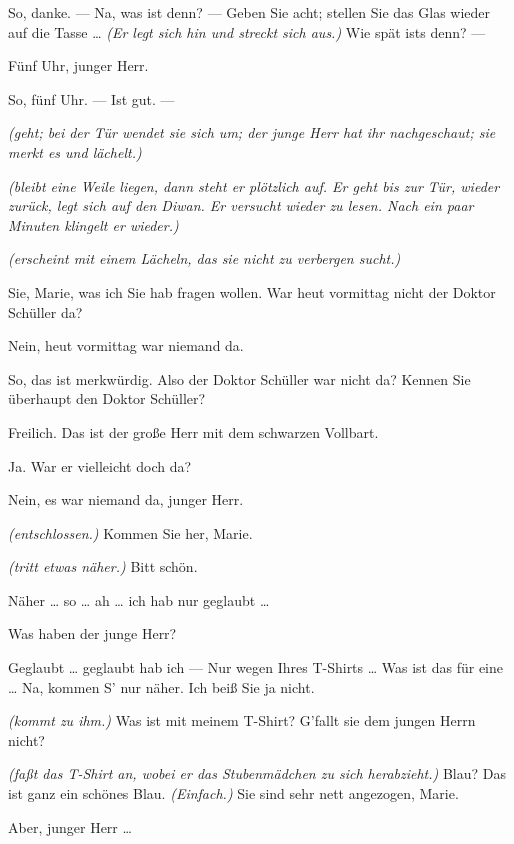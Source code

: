 \documentclass[
	final,
	a4paper,
	ngerman,
	mpinclude = true, %
	twoside = true,
	open = right,
	cleardoublepage = plain,
	DIV = 13,
	BCOR = 1cm,
	titlepage = firstiscover,
	]{scrbook}
\newcommand{\direction}[1]{\textit{(#1)}}
\newcommand{\thecharacter}[1]{\textup{\textsc{#1}}\xspace}
\newcommand{\thepraktikant}{\thecharacter{Timo}}
\newcommand{\theherr}{\thecharacter{Benjamin}}
\newcommand{\character}[1]{\item[#1:]}
\newcommand{\praktikant}{\character{\thepraktikant}}
\newcommand{\herr}{\character{\theherr}}
\begin{document}
\begin{play}
	\herr
	So, danke. --- Na, was ist denn? --- Geben Sie acht; stellen Sie das Glas wieder auf die Tasse \ldots{} \direction{Er legt sich hin und streckt sich aus.} Wie spät ists denn? ---

	\praktikant
	Fünf Uhr, junger Herr.

	\herr
	So, fünf Uhr. --- Ist gut. ---

	\praktikant
	\direction{geht; bei der Tür wendet sie sich um; der junge Herr hat ihr nachgeschaut; sie merkt es und lächelt.}

	\herr
	\direction{bleibt eine Weile liegen, dann steht er plötzlich auf. Er geht bis zur Tür, wieder zurück, legt sich auf den Diwan. Er versucht wieder zu lesen. Nach ein paar Minuten klingelt er wieder.}

	\praktikant
	\direction{erscheint mit einem Lächeln, das sie nicht zu verbergen sucht.}

	\herr
	Sie, Marie, was ich Sie hab fragen wollen. War heut vormittag nicht der Doktor Schüller da?

	\praktikant
	Nein, heut vormittag war niemand da.

	\herr
	So, das ist merkwürdig. Also der Doktor Schüller war nicht da? Kennen Sie überhaupt den Doktor Schüller?

	\praktikant
	Freilich. Das ist der große Herr mit dem schwarzen Vollbart.

	\herr
	Ja. War er vielleicht doch da?

	\praktikant
	Nein, es war niemand da, junger Herr.

	\herr
	\direction{entschlossen.} Kommen Sie her, Marie.

	\praktikant
	\direction{tritt etwas näher.} Bitt schön.

	\herr
	Näher \ldots{} so \ldots{} ah \ldots{} ich hab nur geglaubt \ldots{}

	\praktikant
	Was haben der junge Herr?

	\herr
	Geglaubt \ldots{} geglaubt hab ich --- Nur wegen Ihres T-Shirts \ldots{} Was ist das für eine \ldots{} Na, kommen S' nur näher. Ich beiß Sie ja nicht.

	\praktikant
	\direction{kommt zu ihm.} Was ist mit meinem T-Shirt? G'fallt sie dem jungen Herrn nicht?

	\herr
	\direction{faßt das T-Shirt an, wobei er das Stubenmädchen zu sich herabzieht.} Blau? Das ist ganz ein schönes Blau. \direction{Einfach.} Sie sind sehr nett angezogen, Marie.

	\praktikant
	Aber, junger Herr \ldots{}


\end{play}
\end{document}
